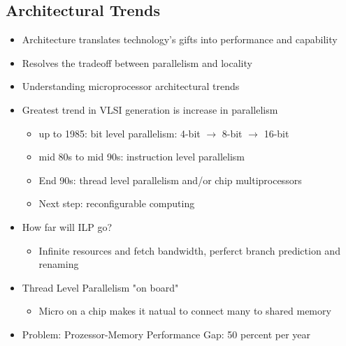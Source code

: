 \subsection{Architectural Trends}
\begin{itemize}
	\item Architecture translates technology's gifts into performance and capability
	\item Resolves the tradeoff between parallelism and locality
	\item Understanding microprocessor architectural trends
	\item Greatest trend in VLSI generation is increase in parallelism
	\begin{itemize}
		\item up to 1985: bit level parallelism: 4-bit \(\to\) 8-bit \(\to\) 16-bit
		\item mid 80s to mid 90s: instruction level parallelism
		\item End 90s: thread level parallelism and/or chip multiprocessors
		\item Next step: reconfigurable computing
	\end{itemize}
	\item How far will ILP go? 
	\begin{itemize}
		\item Infinite resources and fetch bandwidth, perferct branch prediction and renaming
	\end{itemize}
	\item Thread Level Parallelism "on board"
	\begin{itemize}
		\item Micro on a chip makes it natual to connect many to shared memory
	\end{itemize}
	\item Problem: Prozessor-Memory Performance Gap: 50 percent per year
\end{itemize}
